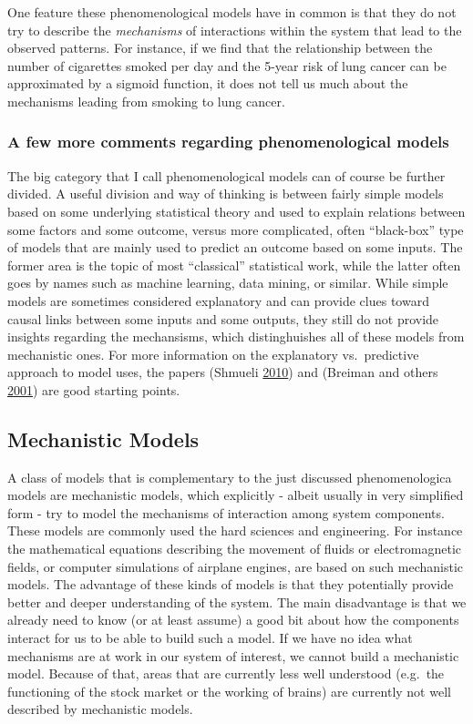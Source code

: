 \documentclass[]{book}
\theoremstyle{definition}
\theoremstyle{definition}
\theoremstyle{definition}
\theoremstyle{remark}
\begin{document}
One feature these phenomenological models have in common is that they do
not try to describe the \emph{mechanisms} of interactions within the
system that lead to the observed patterns. For instance, if we find that
the relationship between the number of cigarettes smoked per day and the
5-year risk of lung cancer can be approximated by a sigmoid function, it
does not tell us much about the mechanisms leading from smoking to lung
cancer.

\subsubsection{A few more comments regarding phenomenological
models}\label{mynotebox}

The big category that I call phenomenological models can of course be
further divided. A useful division and way of thinking is between fairly
simple models based on some underlying statistical theory and used to
explain relations between some factors and some outcome, versus more
complicated, often ``black-box'' type of models that are mainly used to
predict an outcome based on some inputs. The former area is the topic of
most ``classical'' statistical work, while the latter often goes by
names such as machine learning, data mining, or similar. While simple
models are sometimes considered explanatory and can provide clues toward
causal links between some inputs and some outputs, they still do not
provide insights regarding the mechansisms, which distinghuishes all of
these models from mechanistic ones. For more information on the
explanatory vs.~predictive approach to model uses, the papers (Shmueli
\protect\hyperlink{ref-shmueli10}{2010}) and (Breiman and others
\protect\hyperlink{ref-breiman01}{2001}) are good starting points.

\subsection{Mechanistic Models}\label{mechanistic-models}

A class of models that is complementary to the just discussed
phenomenologica models are mechanistic models, which explicitly - albeit
usually in very simplified form - try to model the mechanisms of
interaction among system components. These models are commonly used the
hard sciences and engineering. For instance the mathematical equations
describing the movement of fluids or electromagnetic fields, or computer
simulations of airplane engines, are based on such mechanistic models.
The advantage of these kinds of models is that they potentially provide
better and deeper understanding of the system. The main disadvantage is
that we already need to know (or at least assume) a good bit about how
the components interact for us to be able to build such a model. If we
have no idea what mechanisms are at work in our system of interest, we
cannot build a mechanistic model. Because of that, areas that are
currently less well understood (e.g.~the functioning of the stock market
or the working of brains) are currently not well described by
mechanistic models.
\end{document}
